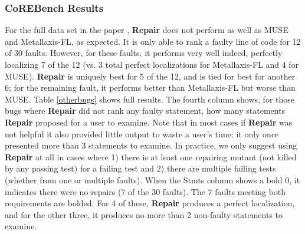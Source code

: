 \subsubsection{CoREBench Results} For the full data set in the paper \cite{Papadakis}, {\bf Repair} does not perform as well as MUSE and Metallaxis-FL, as expected.   It is only able to  rank a faulty line of code for 12 of 30 faults.  However, for these faults, it performs very well indeed, perfectly localizing 7 of the 12 (vs. 3 total perfect localizations for Metallaxis-FL and 4 for MUSE).  {\bf Repair} is uniquely best for 5 of the 12, and is tied for best for another 6; for the remaining fault, it performs better than Metallaxis-FL but worse than MUSE.  Table \ref{otherbugs} shows full results.  The fourth column shows, for those bugs where {\bf Repair} did not rank any faulty statement, how many statements {\bf Repair} proposed for a user to examine.  Note that in most cases if {\bf Repair} was not helpful it also provided little output to waste a user's time: it only once presented more than 3 statements to examine.   In practice, we only suggest using {\bf Repair} at all in cases where 1) there is at least one repairing mutant (not killed by any passing test) for a failing test and 2) there are multiple failing tests (whether from one or multiple faults).  When the Stmts column shows a bold 0, it indicates there were no repairs (7 of the 30 faults).  The 7 faults meeting both requirements are bolded.  For 4 of these, {\bf Repair} produces a perfect localization, and for the other three, it produces no more than 2 non-faulty statements to examine.

